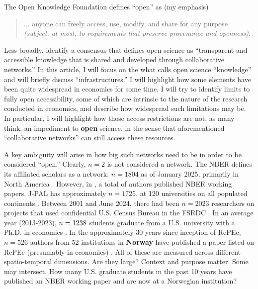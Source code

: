\documentclass{article}
\begin{document}
The Open Knowledge Foundation \parencite[OKF]{open_knowledge_foundation_defining_2024} defines ``open'' as (my emphasis)

\begin{quote}

    ... anyone can freely access, use, modify, and share for any purpose \textit{(subject, at most, to requirements that preserve provenance and openness)}.
    
\end{quote}

Less broadly, \citet{vicente-saez_open_2018} identify a consensus that defines open science as ``transparent and accessible knowledge that is shared and developed through collaborative networks.''
%
In this article, I will focus on the what \cite{unesco_understanding_2022} calls open science ``knowledge'' and will briefly discuss ``infrastructures.'' I will highlight how some elements have been quite widespread in economics for some time. I will try to identify limits to fully open accessibility, some of which are intrinsic to the nature of the research conducted in economics, and describe how widespread such limitations may be. In particular, I will highlight how those access restrictions are not, as many think, an impediment to \textbf{open} science, in the sense that aforementioned ``collaborative networks'' can still access these resources. 


A key ambiguity will arise in how big such networks need to be in order to be considered ``open.'' Clearly, $n=2$ is not considered a network. The \ac{NBER} defines its affiliated scholars as a network: $n=1804$ as of January 2025, primarily in North America \citep{national_bureau_of_economic_research_affiliated_2025}. However, in \nberyear{}, a total of \nberauthorsunique{} authors published \nberpapers{} NBER working papers. J-PAL has approximately $n=1725$, at 120 universities on all populated continents \citep{abdul_latif_jameel_poverty_action_lab_affiliated_2025}. Between 2001 and June 2024, there had been $n=2023$ researchers on projects that used confidential U.S. Census Bureau in the \ac{FSRDC} \citep{us_census_bureau_uscensusbureaufsrdc-external-census-projects_2024}. In an average year (2013-2023), $n=1238{}$ students graduate from a U.S. university with a Ph.D. in economics \citep[Table 1-5]{national_science_foundation_doctorate_2024}. In the approximately 30 years since inception of \ac{RePEc}, $n=526$ authors from 52 institutions in \textbf{Norway} have published a paper listed on \ac{RePEc} (presumably in economics) \citep{ideasrepec_within_2025}. All of these are measured across different spatio-temporal dimensions. Are they large? Context and purpose matter. Some may intersect. How many U.S. graduate students in the past 10 years have published an NBER working paper and are now at a Norwegian institution? 
\end{document}
